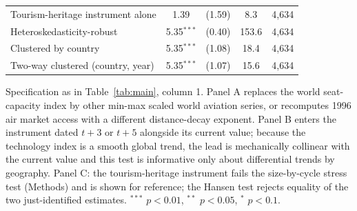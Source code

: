 \documentclass[12pt]{extarticle}
\begin{document}
\begin{table}[H]
{\begin{threeparttable}
\begin{tabular}{lcccc}
  Tourism-heritage instrument alone & 1.39 & (1.59) & 8.3 & 4,634 \\
  Heteroskedasticity-robust & 5.35$^{***}$ & (0.40) & 153.6 & 4,634 \\
  Clustered by country & 5.35$^{***}$ & (1.08) & 18.4 & 4,634 \\
  Two-way clustered (country, year) & 5.35$^{***}$ & (1.07) & 15.6 & 4,634 \\
\bottomrule
\end{tabular}
\begin{tablenotes}\scriptsize
\item Specification as in Table~\ref{tab:main}, column 1. Panel A replaces the world seat-capacity index by other min-max scaled world aviation series, or recomputes 1996 air market access with a different distance-decay exponent. Panel B enters the instrument dated $t+3$ or $t+5$ alongside its current value; because the technology index is a smooth global trend, the lead is mechanically collinear with the current value and this test is informative only about differential trends by geography. Panel C: the tourism-heritage instrument fails the size-by-cycle stress test (Methods) and is shown for reference; the Hansen test rejects equality of the two just-identified estimates. $^{***}$ $p<0.01$, $^{**}$ $p<0.05$, $^{*}$ $p<0.1$.
\end{tablenotes}
\end{threeparttable}}
\end{table}
\end{document}

